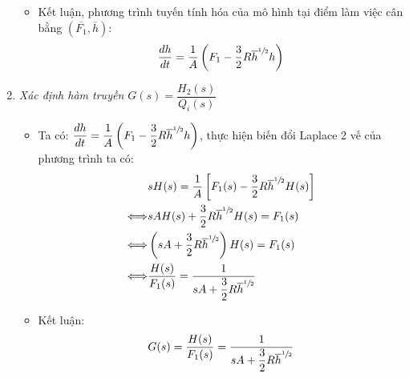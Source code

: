 \begin{enumerate}[\it a.]
\begin{itemize}
                \item Kết luận, phương trình tuyến tính hóa của mô hình tại điểm làm việc cân bằng $\left({\overline{F_1}, \overline{h}}\right)$:
                    \begin{align}
                        \dfrac{dh}{dt} = \dfrac{1}{A} \left({F_1 - \dfrac{3}{2} R \overline{h}^{\sfrac{1}{2}}h}\right)
                    \end{align}
            \end{itemize}

        \item \textit{Xác định hàm truyền $G(s) = \dfrac{H_2(s)}{Q_i(s)}$}
            \begin{itemize}
                \item Ta có: $\dfrac{dh}{dt} = \dfrac{1}{A} \left({F_1 - \dfrac{3}{2} R \overline{h}^{\sfrac{1}{2}} h}\right)$, thực hiện biến đổi Laplace 2 vế của phương trình ta có:
                    \begin{align}
                        & s H(s) = \dfrac{1}{A} \left[{F_1(s) - \dfrac{3}{2} R \overline{h}^{\sfrac{1}{2}} H(s)}\right]\\
                        \Longleftrightarrow & s A H(s) + \dfrac{3}{2} R \overline{h}^{\sfrac{1}{2}} H(s) = F_1(s)\\
                        \Longleftrightarrow & \left({s A + \dfrac{3}{2} R \overline{h}^{\sfrac{1}{2}}}\right) H(s) = F_1(s) \\
                        \Longleftrightarrow & \dfrac{H(s)}{F_1(s)} = \frac{1}{s A + \dfrac{3}{2} R \overline{h}^{\sfrac{1}{2}}}
                    \end{align}

                \item Kết luận:
                    \begin{align}
                        G(s) = \dfrac{H(s)}{F_1(s)} = \frac{1}{s A + \dfrac{3}{2} R \overline{h}^{\sfrac{1}{2}}}
                    \end{align}
            \end{itemize}
    \end{enumerate}
